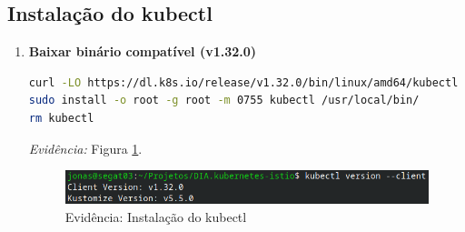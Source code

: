 \documentclass[9pt,a4paper,twocolumn,twoside]{tau-class/tau}
\begin{document}
\subsection{Instalação do kubectl}
\begin{enumerate}[label=\arabic*.]
\item\textbf{Baixar binário compatível (v1.32.0)} \cite{kubernetes}

\begin{lstlisting}[language=Bash]
curl -LO https://dl.k8s.io/release/v1.32.0/bin/linux/amd64/kubectl
sudo install -o root -g root -m 0755 kubectl /usr/local/bin/
rm kubectl
\end{lstlisting}
\textit{Evidência:} Figura \ref{fig:kubectl}.\\

\begin{figure}[h]
    \centering
    \includegraphics[width=1\linewidth]{figures/evidence-kubectl.png}
    \caption{Evidência: Instalação do kubectl}
    \label{fig:kubectl}
\end{figure}
\end{enumerate}
\end{document}
